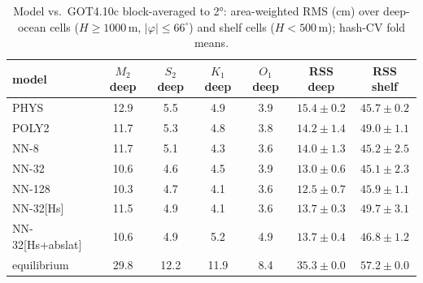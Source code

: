 \begin{table}[t]\centering\footnotesize
\caption{Model vs.\ GOT4.10c block-averaged to 2°: area-weighted RMS (cm) over deep-ocean cells ($H\ge1000$\,m, $|\varphi|\le66^\circ$) and shelf cells ($H<500$\,m); hash-CV fold means.}
\label{tab:benchmark_field}
\begin{tabular}{lcccccc}
\toprule
model & $M_2$ deep & $S_2$ deep & $K_1$ deep & $O_1$ deep & RSS deep & RSS shelf \\
\midrule
PHYS & 12.9 & 5.5 & 4.9 & 3.9 & $15.4\pm0.2$ & $45.7\pm0.2$ \\
POLY2 & 11.7 & 5.3 & 4.8 & 3.8 & $14.2\pm1.4$ & $49.0\pm1.1$ \\
NN-8 & 11.7 & 5.1 & 4.3 & 3.6 & $14.0\pm1.3$ & $45.2\pm2.5$ \\
NN-32 & 10.6 & 4.6 & 4.5 & 3.9 & $13.0\pm0.6$ & $45.1\pm2.3$ \\
NN-128 & 10.3 & 4.7 & 4.1 & 3.6 & $12.5\pm0.7$ & $45.9\pm1.1$ \\
NN-32[Hs] & 11.5 & 4.9 & 4.1 & 3.6 & $13.7\pm0.3$ & $49.7\pm3.1$ \\
NN-32[Hs+abslat] & 10.6 & 4.9 & 5.2 & 4.9 & $13.7\pm0.4$ & $46.8\pm1.2$ \\
equilibrium & 29.8 & 12.2 & 11.9 & 8.4 & $35.3\pm0.0$ & $57.2\pm0.0$ \\
\bottomrule
\end{tabular}
\end{table}
